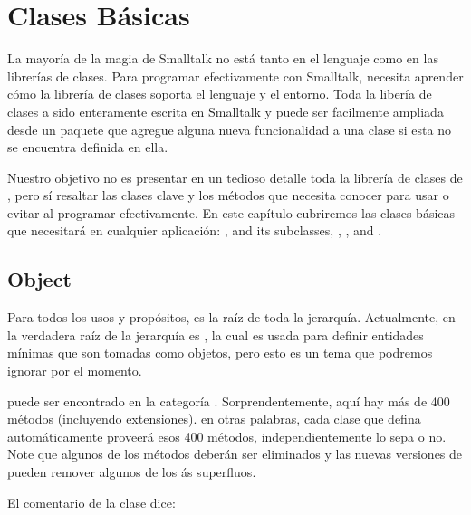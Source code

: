 \documentclass[a4paper,10pt,twoside]{book}
\begin{document}
        \sloppy
\fi
\chapter{Clases B\'asicas}

La mayor\'ia de la magia de Smalltalk no est\'a tanto en el lenguaje como en las librer\'ias de clases. Para programar efectivamente con Smalltalk, necesita aprender c\'omo la librer\'ia de clases soporta el lenguaje y el entorno. Toda la liber\'ia de clases a sido enteramente escrita en Smalltalk y puede ser facilmente ampliada desde un paquete que agregue alguna nueva funcionalidad a una clase si esta no se encuentra definida en ella.

Nuestro objetivo no es presentar en un tedioso detalle toda la librer\'ia de clases de \pharo, pero s\'i resaltar las clases clave y los m\'etodos que necesita conocer para usar o evitar al programar efectivamente. En este cap\'itulo cubriremos las clases b\'asicas que necesitar\'a en cualquier aplicaci\'on: ,  and its subclasses, , ,  and .


\section{Object}
Para todos los usos y prop\'ositos,  es la ra\'iz de toda la jerarqu\'ia. Actualmente, en \pharo la verdadera ra\'iz de la jerarqu\'ia es , la cual es usada para definir entidades m\'inimas que son tomadas como objetos, pero esto es un tema que podremos ignorar por el momento.

puede ser encontrado en la categor\'ia . Sorprendentemente, aqu\'i hay m\'as de 400  m\'etodos (incluyendo extensiones). en otras palabras, cada clase que defina autom\'aticamente proveer\'a esos 400 m\'etodos, independientemente lo sepa o no. Note que algunos de los m\'etodos deber\'an ser eliminados y las nuevas versiones de \pharo pueden remover algunos de los \'as superfluos.

El comentario de la clase  dice:
\end{document}
